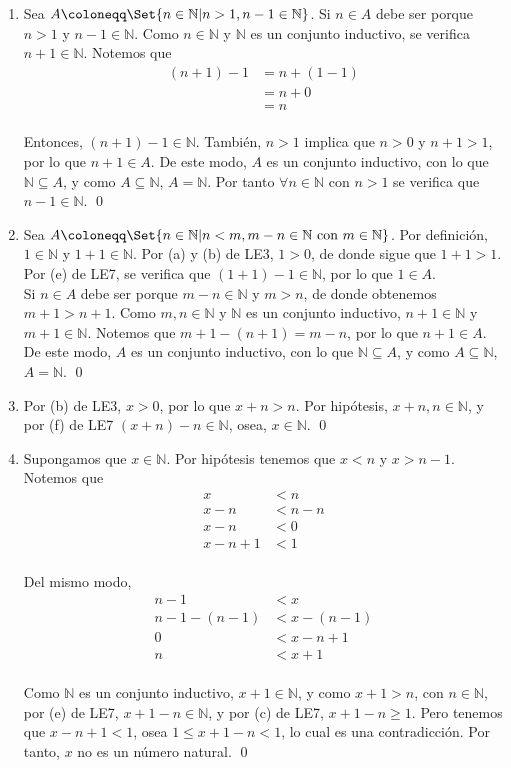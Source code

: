 \documentclass[11pt]{article}
\newcommand{\N}{\mathbb{N}}
\let\set\Set
\begin{document}
\begin{enumerate}[label=\alph*)]
    \item Sea $A \coloneqq \set{n\in \N | n>1, n-1\in \N}$. Si $n\in A$ debe ser porque $n>1$ y $n-1\in \N$. Como $n\in \N$ y $\N$ es un conjunto inductivo, se verifica $n+1\in\N$. Notemos que \begin{align*}
        (n+1)-1 &= n+(1-1) \\
        &= n+ 0\\
        &= n
    \end{align*}\\
    Entonces, $(n+1)-1\in \N$. También, $n>1$ implica que $n>0$ y $n+1>1$, por lo que $n+1\in A$. De este modo, $A$ es un conjunto inductivo, con lo que $\N \subseteq A$, y como $A\subseteq \N$, $A=\N$. Por tanto $\forall n\in \N$ con $n>1$ se verifica que $n-1\in \N$. \qed

    \item Sea $A \coloneqq \set{n\in \N| n<m, m-n\in\N \ \text{con} \ m\in\N}$. Por definición, $1\in \N$ y $1+1\in \N$. Por (a) y (b) de LE3, $1>0$, de donde sigue que $1+1>1$. Por (e) de LE7, se verifica que $(1+1)-1\in \N$, por lo que $1\in A$. \\[5pt] Si $n \in A$ debe ser porque $m-n\in \N$ y $m>n$, de donde obtenemos $m+1>n+1$. Como $m,n\in \N$ y $\N$ es un conjunto inductivo, $n+1\in \N$ y $m+1 \in \N$. Notemos que $m+1-(n+1)=m-n$, por lo que $n+1\in A$. De este modo, $A$ es un conjunto inductivo, con lo que $\N \subseteq A$, y como $A\subseteq \N$, $A=\N$. \qed 
    
    
    \item Por (b) de LE3, $x>0$, por lo que $x+n>n$. Por hipótesis, $x+n, n\in \N$, y por (f) de LE7 $(x+n)-n \in \N$, osea, $x\in \N$. \qed
    
    \item Supongamos que $x\in \N$. Por hipótesis tenemos que $x<n$ y $x>n-1$. Notemos que \begin{align*}
        x &< n\\
        x -n &< n-n\\
        x-n &< 0\\
        x-n +1 &< 1
    \end{align*}\\
    Del mismo modo, \begin{align*}
        n-1 &< x\\
        n-1-(n-1) &< x - (n-1)\\
        0 &< x-n+1\\
        n &< x+1
    \end{align*}\\
    Como $\N$ es un conjunto inductivo, $x+1\in \N$, y como $x+1>n$, con $n\in \N$, por (e) de LE7, $x+1-n \in \N$, y por (c) de LE7, $x+1-n\geq 1$. Pero tenemos que $x-n+1<1$, osea $1\leq x+1-n<1$, lo cual es una contradicción. Por tanto, $x$ no es un número natural. \qed
\end{enumerate}
\end{document}
